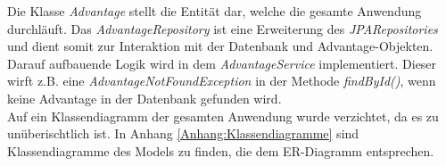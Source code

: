 Die Klasse \textit{Advantage} stellt die Entität dar, welche die gesamte Anwendung durchläuft.
Das \textit{AdvantageRepository} ist eine Erweiterung des \textit{JPARepositories} und dient somit zur Interaktion mit der Datenbank und Advantage-Objekten.
Darauf aufbauende Logik wird in dem \textit{AdvantageService} implementiert. Dieser wirft z.B. eine \textit{AdvantageNotFoundException} in der
Methode \textit{findById()}, wenn keine Advantage in der Datenbank gefunden wird.
\\
Auf ein Klassendiagramm der gesamten Anwendung wurde verzichtet, da es zu unüberischtlich ist.
In Anhang \ref{Anhang:Klassendiagramme} sind Klassendiagramme des Models zu finden, die dem ER-Diagramm entsprechen.



